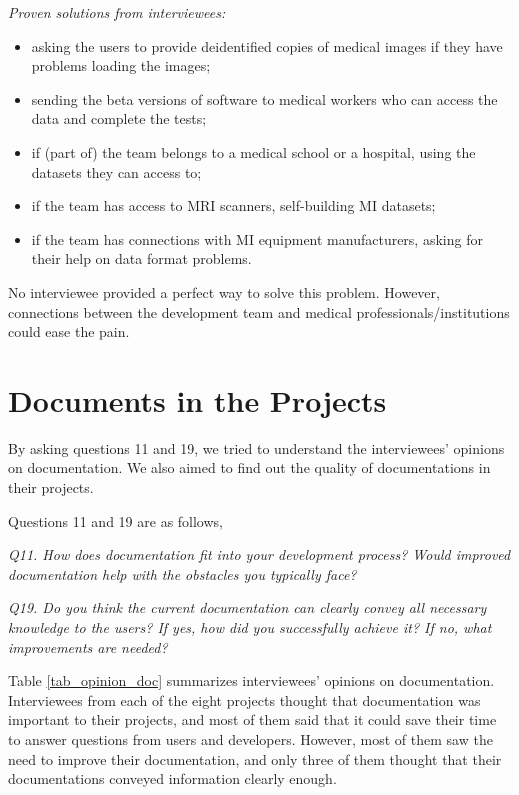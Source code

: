 \textit{Proven solutions from interviewees:}
\begin{itemize}
\item asking the users to provide deidentified copies of medical images if they have problems loading the images;
\item sending the beta versions of software to medical workers who can access the data and complete the tests;
\item if (part of) the team belongs to a medical school or a hospital, using the datasets they can access to;
\item if the team has access to MRI scanners, self-building MI datasets;
\item if the team has connections with MI equipment manufacturers, asking for their help on data format problems.
\end{itemize}

No interviewee provided a perfect way to solve this problem. However, connections between the development team and medical professionals/institutions could ease the pain.

\section{Documents in the Projects}
\label{sec_interview_documents}
By asking questions 11 and 19, we tried to understand the interviewees' opinions on documentation. We also aimed to find out the quality of documentations in their projects.

Questions 11 and 19 are as follows,

\textit{Q11. How does documentation fit into your development process? Would improved documentation help with the obstacles you typically face?}

\textit{Q19. Do you think the current documentation can clearly convey all necessary knowledge to the users? If yes, how did you successfully achieve it? If no, what improvements are needed?}

Table \ref{tab_opinion_doc} summarizes interviewees' opinions on documentation. Interviewees from each of the eight projects thought that documentation was important to their projects, and most of them said that it could save their time to answer questions from users and developers. However, most of them saw the need to improve their documentation, and only three of them thought that their documentations conveyed information clearly enough. 


